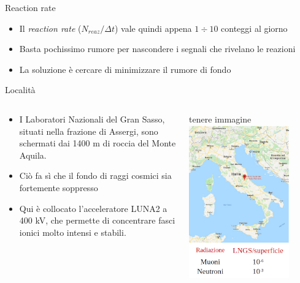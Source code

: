\documentclass [xcolor=svgnames] {beamer}
\begin{document}
\begin{frame}{Reaction rate}
	\begin{itemize}
			\item<1-> Il \emph{reaction rate} ($N_{reaz}/\Delta t$) vale quindi appena $1\div 10$ conteggi al giorno
			\item<2-> Basta pochissimo rumore per nascondere i segnali che rivelano le reazioni
			\item<3-> La soluzione è cercare di minimizzare il rumore di fondo 
		\end{itemize}
\end{frame}

	\begin{frame}{Località}
			\begin{columns}
					\begin{column}{0.5\textwidth}
							\begin{itemize}
									\item<1-> I Laboratori Nazionali del Gran Sasso, situati nella frazione di Assergi, sono schermati dai 1400 m di roccia del Monte Aquila.
									\item<2-> Ciò fa sì che il fondo di raggi cosmici sia fortemente soppresso
									\item<3-> Qui è collocato l'acceleratore LUNA2 a 400 kV, che permette di concentrare fasci ionici molto intensi e stabili.
								\end{itemize}
						\end{column}
					\begin{column}{0.5\textwidth}
			tenere immagine
							\centering
							\includegraphics[width=0.8\textwidth]{img/location.png}

\end{column}
\end{columns}
\end{frame}
\end{document}

